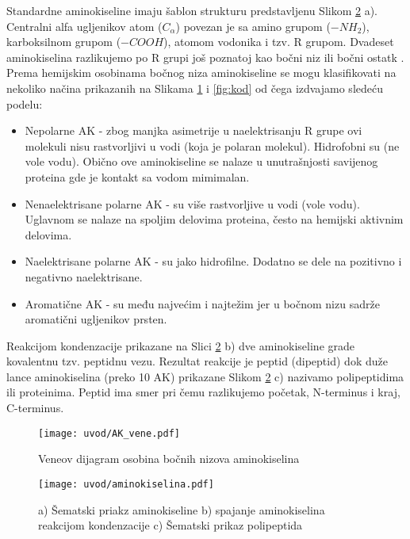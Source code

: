 Standardne aminokiseline imaju šablon strukturu predstavljenu Slikom \ref{fig:AK} a).
Centralni alfa ugljenikov atom ($C_{\alpha}$) povezan je sa amino grupom ($-NH_2$), 
karboksilnom grupom ($-COOH$), atomom vodonika i tzv. R grupom. Dvadeset aminokiselina
razlikujemo po R grupi još poznatoj kao bočni niz ili bočni ostatk .
Prema hemijskim osobinama bočnog niza aminokiseline se mogu klasifikovati na
nekoliko načina prikazanih na Slikama \ref{fig:AK_vene} i \ref{fig:kod} od
čega izdvajamo sledeću podelu:
\begin{itemize}
  \item Nepolarne AK -
    zbog manjka asimetrije u naelektrisanju R grupe ovi molekuli nisu
    rastvorljivi u vodi (koja je polaran molekul). Hidrofobni su (ne vole
    vodu).  Obično ove aminokiseline se nalaze u unutrašnjosti savijenog proteina gde
    je kontakt sa vodom mimimalan.
    
  \item Nenaelektrisane polarne AK -
    su više rastvorljive u vodi (vole vodu).  Uglavnom se nalaze na spoljim
    delovima proteina, često na hemijski aktivnim delovima.

  \item Naelektrisane polarne AK -
    su jako hidrofilne. Dodatno se dele na pozitivno i negativno naelektrisane.

  \item Aromatične AK - su među najvećim i najtežim jer u bočnom nizu sadrže
    aromatični ugljenikov prsten.
\end{itemize}

Reakcijom kondenzacije prikazane na Slici \ref{fig:AK} b) dve aminokiseline
grade kovalentnu tzv. peptidnu vezu. Rezultat reakcije je peptid (dipeptid) dok
duže lance aminokiselina (preko 10 AK) prikazane Slikom \ref{fig:AK} c)
nazivamo polipeptidima ili proteinima. Peptid ima smer pri čemu razlikujemo
početak, N-terminus i kraj, C-terminus.
\clearpage

\begin{figure}[th]
\centering
\texttt{[image: uvod/AK\_vene.pdf]}
\caption {Veneov dijagram osobina bočnih nizova aminokiselina}
\label{fig:AK_vene}
\end{figure}

\begin{figure}[th]
\centering
\texttt{[image: uvod/aminokiselina.pdf]}
\caption {a) Šematski priakz aminokiseline
b) spajanje aminokiselina reakcijom kondenzacije
c) Šematski prikaz polipeptida
}
\label{fig:AK}
\end{figure}


